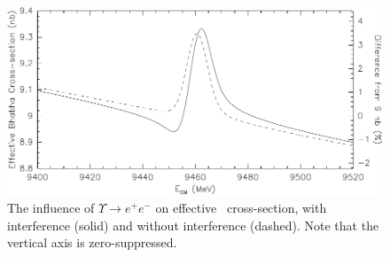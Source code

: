 \documentclass{cornell}
\begin{document}
\begin{figure}[p]
  \begin{center}
    \includegraphics[width=\linewidth]{plots/allee}
  \end{center}
  \caption{\label{allee} The influence of $\Upsilon \to e^+e^-$ on
  effective \ee\ cross-section, with interference (solid) and without
  interference (dashed).  Note that the vertical axis is
  zero-suppressed.}
\end{figure}
\end{document}
